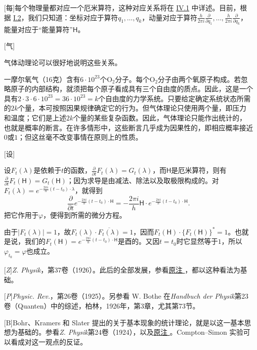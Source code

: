 \documentclass[fontsize=13pt,twoside,openany,headings=normal,parskip=false,bookmarkpackage=false,DIV=calc]{scrbook}
\begin{document}
[每]{每个物理量都对应一个厄米算符，这种对应关系将在 \hyperref[sec:IV.1]{IV.1} 中详述。目前，根据 \hyperref[sec:I.2]{I.2}，我们只知道：坐标对应于算符$q_1,\allowbreak \ldots,\allowbreak q_k$，动量对应于算符$\frac{h}{2\pi i}\frac{\partial}{\partial q_1},\allowbreak \ldots,\allowbreak \frac{h}{2\pi i}\frac{\partial}{\partial q_k}$，能量对应于“能量算符”$\mathsf H$。}

[气]{气体动理论可以很好地说明这些关系。

一摩尔氧气（16克）含有$6\cdot10^{23}$个$\mathrm O_2$分子。每个$\mathrm O_2$分子由两个氧原子构成。若忽略原子的内部结构，就须把每个原子看成具有三个自由度的质点。因此，这是一个具有$2\cdot3\cdot6\cdot10^{23}=36\cdot10^{23}=k$个自由度的力学系统。只要给定确定系统状态所需的$2k$个量，本可按照因果规律确定它的行为。但气体理论只使用两个量，即压力和温度；它们是上述$2k$个量的某些复杂函数。因此，气体理论只能作出统计的，也就是概率的断言。在许多情形中，这些断言几乎成为因果性的，即相应概率接近$0$或$1$；但这丝毫不改变事情在原则上的性质。}

[设]{设$F_t(\lambda)$是依赖于$t$的函数，$\frac{\partial}{\partial t}F_t(\lambda)=G_t(\lambda)$，而$\mathsf H$是厄米算符，则有$\frac{\partial}{\partial t}F_t(\mathsf H)=G_t(\mathsf H)$；因为求导是由减法、除法以及取极限构成的。对$F_t(\lambda)=e^{-\frac{2\pi i}{h}(t-t_0)\cdot\lambda}$，就得到
\[
\frac{\partial}{\partial t}e^{-\frac{2\pi i}{h}(t-t_0)\cdot\mathsf H}
=-\frac{2\pi i}{h}\mathsf H\cdot e^{-\frac{2\pi i}{h}(t-t_0)\cdot\mathsf H}.
\]
把它作用于$\varphi$，便得到所需的微分方程。

由于$|F_t(\lambda)|=1$，故$F_t(\lambda)\cdot\overline{F_t(\lambda)}=1$，因而$F_t(\mathsf H)\cdot\{F_t(\mathsf H)\}^*=1$。也就是说，我们的$F_t(\mathsf H)=e^{-\frac{2\pi i}{h}(t-t_0)\cdot\mathsf H}$是酉的。又因$t=t_0$时它显然等于$1$，所以$\varphi_{t_0}=\varphi$也成立。}

[\emph{Z}]{\emph{Z. Physik}，第37卷（1926）。此后的全部发展，参看\CJKglue \hyperlink{note-2}{原注 }，都以这种看法为基础。}

[\emph{P}]{\emph{Physic. Rev.}，第26卷（1925）。另参看 W. Bothe 在\emph{Handbuch der Physik}第23卷（Quanten）中的综述，柏林，1926年，第3章，尤其第73节。}

[B]{Bohr、Kramers 和 Slater 提出的关于基本现象的统计理论，就是以这一基本思想为基础的。参看\hypertarget{origpage-251}{}\label{origpage-251}\emph{Z. Physik}第24卷（1924），以及\CJKglue \hyperlink{note-123}{原注 }。Compton--Simon 实验可以看成对这一观点的反证。}
\end{document}
